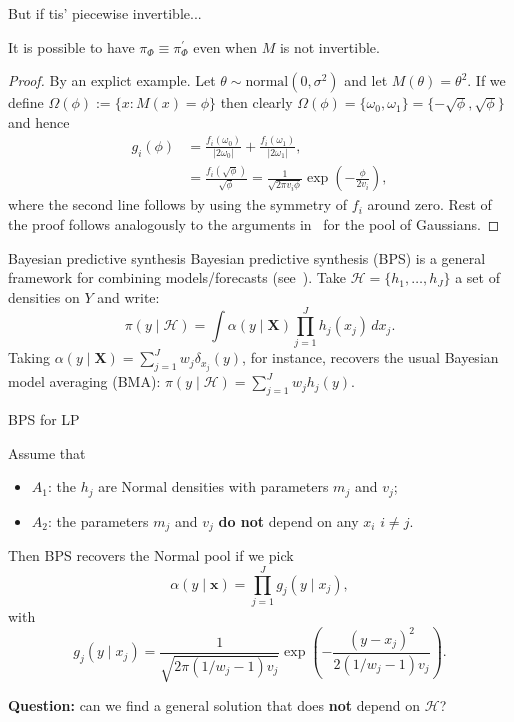 \begin{frame}{But if tis' piecewise invertible...}
\begin{remark}
 \label{rmk:invertibleIFF}
 It is possible to have  $\pi_\Phi \equiv \pi_\Phi^{\prime}$ even when $M$ is not invertible.
\end{remark}
\begin{proof}
 By an explict example. 
 Let $\theta \sim \text{normal}(0, \sigma^2)$ and let $M(\theta) = \theta^2$.
 If we define $\Omega(\phi) := \{ x: M(x) = \phi \}$ then clearly $\Omega(\phi) = \{ \omega_0, \omega_1 \} = \{ -\sqrt{\phi}, \sqrt{\phi} \}$ and hence
 \begin{align*}
 \label{eq:normalInvert}
 g_i(\phi) &= \frac{f_i(\omega_0)}{|2\omega_0|} + \frac{f_i(\omega_1)}{|2\omega_1|}, \\
        &= \frac{f_i(\sqrt{\phi})}{\sqrt{\phi}} = \frac{1}{\sqrt{2\pi v_i \phi}} \exp\left(-\frac{\phi}{2v_i}\right),
\end{align*}
where the second line follows by using the symmetry of $f_i$ around zero.
Rest of the proof follows analogously to the arguments in~\cite{Carvalho2021} for the pool of Gaussians.
\end{proof}
\end{frame}
\begin{frame}{Bayesian predictive synthesis}
Bayesian predictive synthesis (BPS) is a general framework for combining models/forecasts (see~\cite{McAlinn2018}).
 Take $\mathcal{H} = \{h_1, \ldots, h_J\}$ a set of densities on $Y$ and write:
 \begin{equation*}
  \pi(y \mid \mathcal{H}) = \int \alpha(y \mid \boldsymbol{X})\prod_{j=1}^J h_j(x_j)\,dx_j.
 \end{equation*}
 Taking $\alpha(y \mid \boldsymbol{X})= \sum_{j=1}^J w_j\delta_{x_j}(y)$, for instance, recovers the usual Bayesian model averaging (BMA): $\pi(y \mid \mathcal{H}) =\sum_{j=1}^J w_j h_j(y)$.
\end{frame}
\begin{frame}{BPS for LP}
\begin{remark}
Assume that 
\begin{itemize}
 \item $A_1$: the $h_j$ are Normal densities with parameters $m_j$ and $v_j$;
 \item $A_2$: the parameters $m_j$ and $v_j$ \textbf{do not} depend on any $x_i$ $i\neq j$.
\end{itemize} 
Then BPS recovers the Normal pool if we pick
 \begin{equation}
  \alpha(y \mid \boldsymbol{x}) = \prod_{j=1}^J g_j(y\mid x_j),
 \end{equation}
 with
 \begin{equation*}
   g_j(y \mid x_j) = \frac{1}{\sqrt{2\pi \left(1/w_j - 1\right)v_j}}\exp\left(-\frac{(y-x_j)^2}{2\left(1/w_j - 1\right)v_j}\right).
 \end{equation*}
\end{remark}
{\large \textbf{Question:}} can we find a general solution that does \textbf{not} depend on $\mathcal{H}$?
\end{frame}
